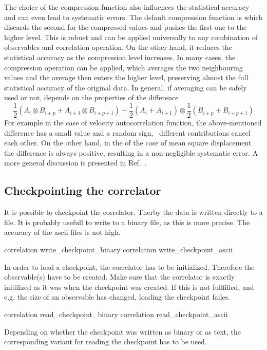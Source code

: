 The choice of the compression function also influences the statistical
accuracy and can even lead to systematic errors. The default compression 
function is  which discards the second for the compressed 
values and pushes the first one to the higher level. This is robust and 
can be applied universally to any combination of observables and
correlation operation. On the other hand, it reduces the
statistical accuracy as the compression level increases.
In many cases, the  compression operation
can be applied, which averages the two neighbouring values
and the average then enters the higher level, preserving
almost the full statistical accuracy of the original data. 
In general, if averaging can be safely used or not, depends on the 
properties of the difference
\begin{equation} 
\frac{1}{2} (A_i \otimes B_{i+p} + A_{i+1} \otimes B_{i+p+1} ) - 
\frac{1}{2} (A_i + A_{i+1} ) \otimes \frac{1}{2} (B_{i+p} +  B_{i+p+1})
\label{eq:difference}
\end{equation} 
For example in the case of velocity autocorrelation function, the
above-mentioned difference has a small value and a random sign, \ie\ 
different contributions cancel each other. On the other hand, in the
of the case of mean square displacement the difference is always positive,
resulting in a non-negligible systematic error. A more general
discussion is presented in Ref.~\cite{ramirez10a}.


\subsection{Checkpointing the correlator}
It is possible to checkpoint the correlator. Therby the data is written
directly to a file. It is probably usefull to write to a binary file, as this
is more precise.
The accuracy of the ascii files is not high.
\begin{essyntax}
 correlation  write_checkpoint_binary 
\variant{2} correlation \var{id} write_checkpoint_ascii \var{filename}
\end{essyntax}

In order to load a checkpoint, the correlator has to be initialized. Therefore
the observable(s) have to be created. Make sure that the correlator is exactly
initilized as it was when the checkpoint was created. If this is not
fullfilled, and e.g. the size of an observable has changed, loading the
checkpoint failes.
\begin{essyntax}
 correlation  read_checkpoint_binary 
\variant{2} correlation \var{id} read_checkpoint_ascii \var{filename}
\end{essyntax}
Depending on whether the checkpoint was written as binary or as text, the
corresponding variant for reading the checkpoint has to be used.

